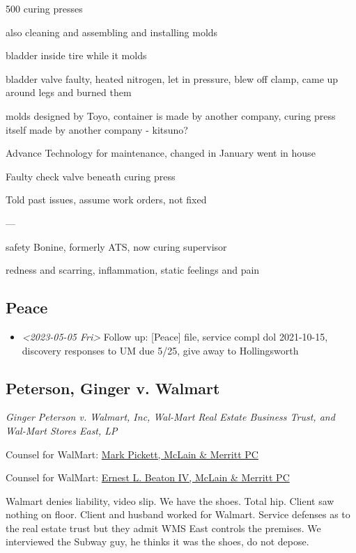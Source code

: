 \documentclass[11pt]{article}
\begin{document}
500 curing presses

also cleaning and assembling and installing molds

bladder inside tire while it molds

bladder valve faulty, heated nitrogen, let in pressure, blew off clamp, came up around legs and burned them

molds designed by Toyo, container is made by another company, curing press itself made by another company - kitsuno?

Advance Technology for maintenance, changed in January went in house

Faulty check valve beneath curing press

Told past issues, assume work orders, not fixed

---

safety Bonine, formerly ATS, now curing supervisor

redness and scarring, inflammation, static feelings and pain

\subsection*{Peace}
\label{sec:org5e98caa}

\begin{itemize}
\item \textit{<2023-05-05 Fri> } Follow up: [Peace] file, service compl dol 2021-10-15, discovery responses to UM due 5/25, give away to Hollingsworth
\end{itemize}

\subsection*{Peterson, Ginger v. Walmart}
\label{sec:org44aef7c}

\emph{Ginger Peterson v. Walmart, Inc, Wal-Mart Real Estate Business Trust, and Wal-Mart Stores East, LP}

Counsel for WalMart: \href{https://gabar.reliaguide.com/lawyer/31708-GA-Mark-Pickett-246349}{Mark Pickett, McLain \& Merritt PC}

Counsel for WalMart: \href{https://gabar.reliaguide.com/lawyer/30326-GA-Ernest-Beaton-253895}{Ernest L. Beaton IV, McLain \& Merritt PC}

Walmart denies liability, video slip. We have the shoes. Total hip. Client saw nothing on floor. Client and husband worked for Walmart. Service defenses as to the real estate trust but they admit WMS East controls the premises. We interviewed the Subway guy, he thinks it was the shoes, do not depose.
\end{document}

